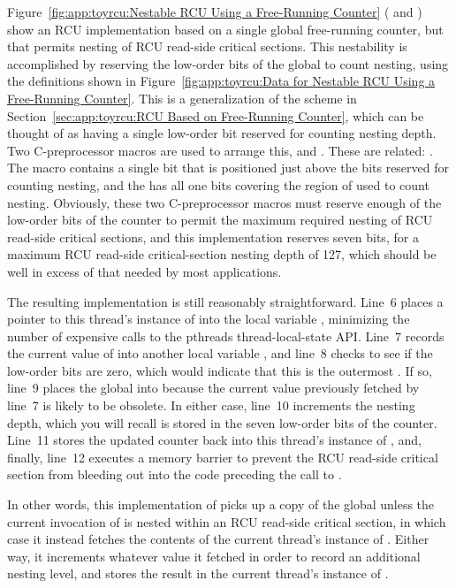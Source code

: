 Figure~\ref{fig:app:toyrcu:Nestable RCU Using a Free-Running Counter}
( and )
show an RCU implementation based on a single global free-running counter,
but that permits nesting of RCU read-side critical sections.
This nestability is accomplished by reserving the low-order bits of the
global  to count nesting, using the definitions shown in
Figure~\ref{fig:app:toyrcu:Data for Nestable RCU Using a Free-Running Counter}.
This is a generalization of the scheme in
Section~\ref{sec:app:toyrcu:RCU Based on Free-Running Counter},
which can be thought of as having a single low-order bit reserved
for counting nesting depth.
Two C-preprocessor macros are used to arrange this,
 and
.
These are related: .
The  macro contains a single bit that is
positioned just above the bits reserved for counting nesting,
and the  has all one bits covering the
region of  used to count nesting.
Obviously, these two C-preprocessor macros must reserve enough
of the low-order bits of the counter to permit the maximum required
nesting of RCU read-side critical sections, and this implementation
reserves seven bits, for a maximum RCU read-side critical-section
nesting depth of 127, which should be well in excess of that needed
by most applications.

The resulting  implementation is still reasonably
straightforward.
Line~6 places a pointer to this thread's instance of 
into the local variable , minimizing the number of expensive
calls to the pthreads thread-local-state API.
Line~7 records the current value of  into another
local variable , and line~8 checks to see if the low-order
bits are zero, which would indicate that this is the outermost
.
If so, line~9 places the global  into  because
the current value previously fetched by line~7 is likely to be obsolete.
In either case, line~10 increments the nesting depth, which you will
recall is stored in the seven low-order bits of the counter.
Line~11 stores the updated counter back into this thread's instance
of , and, finally, line~12 executes a memory
barrier to prevent the RCU read-side critical section from bleeding out
into the code preceding the call to .

In other words, this implementation of  picks up a copy
of the global  unless the current invocation of
 is nested within an RCU read-side critical section,
in which case it instead fetches the contents of the current thread's
instance of .
Either way, it increments whatever value it fetched in order to record
an additional nesting level, and stores the result in the current
thread's instance of .

